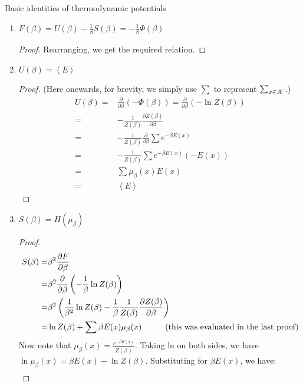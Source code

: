 \documentclass[letterpaper,english,10pt]{article}
\begin{document}
\begin{lem} Basic identities of thermodynamic potentials
\begin{enumerate}
\item $F(\beta)=U(\beta)-\frac{1}{\beta}S(\beta)=-\frac{1}{\beta} \Phi(\beta)$
\begin{proof}
Rearranging, we get the required relation.
\end{proof}
\item $U(\beta)=\left\langle E \right\rangle$ 
\begin{proof}
(Here onewards, for brevity, we simply use $\sum$ to represent $\sum_{x \in \mathscr{X}}$.)
\begin{align*}
U(\beta)=&\frac{\partial}{\partial \beta}\left(-\Phi(\beta) \right)=\frac{\partial}{\partial \beta}(- \ln Z(\beta)) \\
=&-\frac{1}{Z(\beta)} \frac{\partial Z(\beta)}{\partial \beta}\\
=&-\frac{1}{Z(\beta)} \frac{\partial}{\partial \beta} \sum e^{-\beta E(x)}\\
=&-\frac{1}{Z(\beta)} \sum e^{-\beta E(x)} (-E(x))\\
=&\sum \mu_{\beta}(x) E(x)\\
=&\left\langle E \right\rangle
\end{align*}
\end{proof}
\item $S(\beta)=H(\mu_\beta)$
\begin{proof}
\begin{align*}
S(\beta)=&\beta^2 \frac{\partial F}{\partial \beta}\\
=&\beta^2 \frac{\partial }{\partial \beta} \left(-\frac{1}{\beta} \ln Z(\beta) \right)\\
=& \beta^2 \left( \frac{1}{\beta^2} \ln Z(\beta) - \frac{1}{\beta }\frac{1}{Z(\beta)}\frac{\partial Z(\beta)}{\partial \beta} \right) \\
=& \ln Z(\beta) +\sum \beta E(x) \mu_\beta (x) \hspace{10mm} \text{(this was evaluated in the last proof)} \\
\end{align*}
Now note that $\mu_{\beta}(x)=\frac{e^{-\beta E(x)}}{Z(\beta)}$. Taking ln on both sides, we have $\ln \mu_\beta(x)=\beta E(x)-\ln Z(\beta)$. Substituting for $\beta E(x)$, we have:
\begin{align*}

\end{align*}
\end{proof}
\end{enumerate}
\end{lem}
\end{document}
